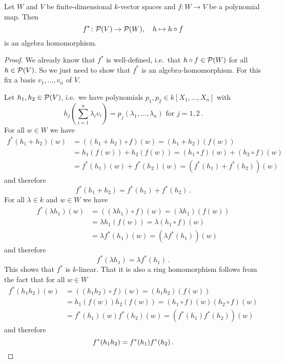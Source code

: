 \begin{lem}
  Let $W$ and $V$ be finite-dimensional $k$-vector spaces and $f \colon W \to V$ be a polynomial map. Then
  \[
            f^*
    \colon  \mathcal{P}(V)
    \to     \mathcal{P}(W),
    \quad   h
    \mapsto h \circ f
  \]
  is an algebra homomorphism.
\end{lem}
\begin{proof}
  We already know that $f^*$ is well-defined, i.e.\ that $h \circ f \in \mathcal{P}(W)$ for all $h \in \mathcal{P}(V)$.
  So we just need to show that $f^*$ is an algebra-homomorphism.
  For this fix a basis $v_1, \dotsc, v_n$ of $V$.
  
  Let $h_1, h_2\in \mathcal{P}(V)$, i.e.\ we have polynomials $p_1, p_2\in k[X_1, \dotsc, X_n]$ with
  \[
      h_j\left( \sum_{i=1}^n \lambda_i v_i \right)
    = p_j(\lambda_1, \dotsc, \lambda_n)
    \text{ for }
    j = 1, 2 \,.
  \]
  For all $w \in W$ we have
  \begin{align*}
        f^*(h_1+h_2)(w)
    &=  ((h_1 + h_2) \circ f)(w)
     =  (h_1 + h_2)(f(w)) \\
    &=  h_1(f(w)) + h_2(f(w))
     =  (h_1 \circ f)(w) + (h_2 \circ f)(w) \\
    &=  f^*(h_1)(w) + f^*(h_2)(w)
     =  (f^*(h_1)+f^*(h_2))(w)
  \end{align*}
  and therefore
  \[
      f^*(h_1 + h_2)
    = f^*(h_1) + f^*(h_2) \,.
  \]
  For all $\lambda \in k$ and $w \in W$ we have
  \begin{align*}
        f^*(\lambda h_1)(w)
    &=  ((\lambda h_1) \circ f)(w)
     =  (\lambda h_1)(f(w)) \\
    &=  \lambda h_1(f(w))
     =  \lambda (h_1 \circ f)(w) \\
    &=  \lambda f^*(h_1)(w)
     =  (\lambda f^*(h_1))(w)
  \end{align*}
  and therefore
  \[
      f^*(\lambda h_1)
    = \lambda f^*(h_1) \,.
  \]
  This shows that $f^*$ is $k$-linear. That it is also a ring homomorphism follows from the fact that for all $w \in W$
  \begin{align*}
        f^*(h_1 h_2)(w)
    &=  ((h_1 h_2) \circ f)(w)
     =  (h_1 h_2)(f(w)) \\
    &=  h_1(f(w)) h_2(f(w))
     =  (h_1 \circ f)(w) (h_2 \circ f)(w) \\
    &=  f^*(h_1)(w) f^*(h_2)(w)
     =  (f^*(h_1) f^*(h_2))(w)
  \end{align*}
  and therefore
  \[
      f^*(h_1 h_2)
    = f^*(h_1) f^*(h_2) \,.
    \qedhere
  \]
\end{proof}


